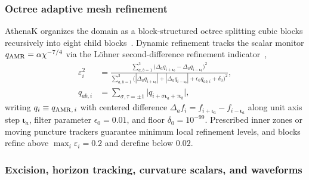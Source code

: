 \subsubsection{Octree adaptive mesh refinement}

AthenaK organizes the domain as a block-structured octree splitting cubic blocks recursively into eight child blocks~\cite{2020ApJS..249....4S,2026ApJS..283...27S}. Dynamic refinement tracks the scalar monitor $q_{\rm AMR} = \alpha\chi^{-7/4}$ via the L\"ohner second-difference refinement indicator~\cite{1987CMAME..61..323L,Wu:2026nrpic},
\begin{align}\label{eq:refinement_indicator}
\varepsilon_i^2 &= \frac{\sum_{a,b=1}^{3} \bigl(\Delta_a q_{i+\bm{\iota}_b} - \Delta_a q_{i-\bm{\iota}_b}\bigr)^2}{\sum_{a,b=1}^{3} \bigl(|\Delta_a q_{i+\bm{\iota}_b}| + |\Delta_a q_{i-\bm{\iota}_b}| + \epsilon_0 q_{ab,i} + \delta_0\bigr)^2}, \nonumber\\
q_{ab,i} &= \sum_{\sigma,\tau=\pm 1} \bigl|q_{i+\sigma\bm{\iota}_a+\tau\bm{\iota}_b}\bigr|,
\end{align}
writing $q_i \equiv q_{{\rm AMR},\,i}$ with centered difference $\Delta_a f_i = f_{i+\bm{\iota}_a} - f_{i-\bm{\iota}_a}$ along unit axis step $\bm{\iota}_a$, filter parameter $\epsilon_0 = 0.01$, and floor $\delta_0 = 10^{-99}$. Prescribed inner zones or moving puncture trackers guarantee minimum local refinement levels, and blocks refine above $\max_i \varepsilon_i = 0.2$ and derefine below $0.02$.

\subsubsection{Excision, horizon tracking, curvature scalars, and waveforms}

